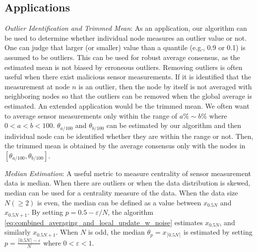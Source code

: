 \documentclass[journal]{IEEEtran}
\begin{document}
%



\vspace{-1mm}
\subsection{Applications}
\emph{Outlier Identification and Trimmed Mean}: As an application, our algorithm can be used to determine whether individual node measures an outlier value or not. One can judge that larger (or smaller) value than a quantile (e.g., 0.9 or 0.1) is assumed to be outliers. This can be used for robust average consensus, as the estimated mean is not biased by erroneous outliers. Removing outliers is often useful when there exist malicious sensor measurements. If it is identified that the measurement at node $n$ is an outlier, then the node by itself is not averaged with neighboring nodes so that the outliers can be removed when the global average is estimated. An extended application would be the trimmed mean. We often want to average sensor measurements only within the range of $a\% \sim b\%$ where $0 < a < b < 100$. $\theta_{a/100}$ and $\theta_{b/100}$ can be estimated by our algorithm and then individual node can be identified whether they are within the range or not. Then, the trimmed mean is obtained by the average consensus \cite{Boyd2004,Olfati2007} only with the nodes in $[\theta_{a/100},\theta_{b/100}]$. 

\emph{Median Estimation}: A useful metric to measure centrality of sensor measurement data is median. When there are outliers or when the data distribution is skewed, median can be used for a centrality measure of the data. When the data size $N (\ge 2)$ is even, the median can be defined as a value between $x_{0.5N}$ and $x_{0.5N+1}$. By setting $p = 0.5 - \varepsilon/N$, the algorithm \eqref{eq:combined_averaging_and_local_update_w_noise} estimates $x_{0.5N}$, and similarly $x_{0.5N+1}$. When $N$ is odd, the median $\theta_p = x_{\lceil0.5N\rceil}$ is estimated by setting $p = \frac{\lceil0.5N\rceil-\varepsilon}{N}$ where $0<\varepsilon<1$.
\end{document}
